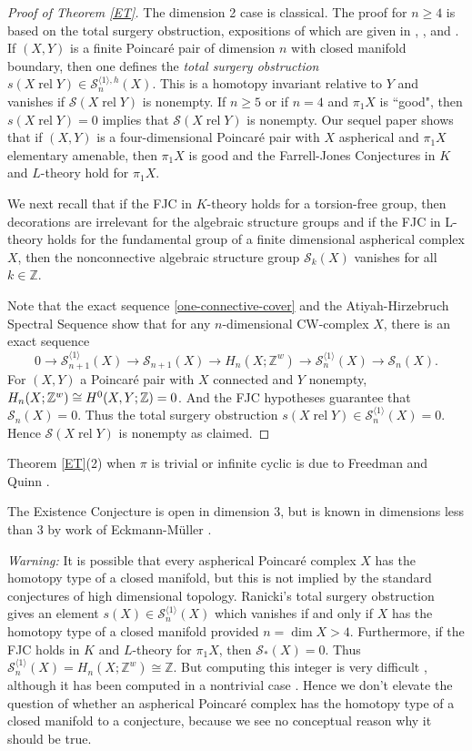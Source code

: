 \documentclass[12pt]{amsart}
\theoremstyle{definition}
\newcommand{\Z}{\mathbb Z}
\DeclareMathOperator{\rel}{rel}
\newcommand{\cS}{\mathcal S}
\begin{document}
\begin{proof}[Proof of Theorem \ref{ET}]
The dimension 2 case is classical.
 The proof for $n \geq 4$ is based on the total surgery obstruction, expositions of which are given in \cite{Ra}, \cite{R92}, and \cite{KMM}.    If $(X,Y)$ is a finite Poincar\'e pair of dimension $n$ with closed manifold boundary, then one defines the {\em total surgery obstruction} $s(X \rel Y) \in \cS^{\langle 1 \rangle,h}_n(X)$. This is a homotopy invariant relative to $Y$ and vanishes if $\cS(X \rel Y)$ is nonempty.   If $n \geq 5$ or if $n=4$ and $\pi_1X$ is ``good", then $s(X \rel Y) = 0$ implies that  $\cS(X \rel Y)$ is nonempty.  Our sequel paper \cite{DH2} shows that if $(X,Y)$ is a four-dimensional Poincar\'e pair with $X$ aspherical and $\pi_1X$ elementary amenable, then $\pi_1X$ is good and the Farrell-Jones Conjectures in $K$ and $L$-theory hold for $\pi_1X$.
 
 We next recall that if the FJC in $K$-theory holds for a torsion-free group, then decorations are irrelevant for the algebraic structure groups and if the FJC in L-theory holds for the fundamental group of a finite dimensional aspherical complex $X$, then the nonconnective algebraic structure group $\cS_k(X)$ vanishes for all $k \in \Z$.
 
 
 Note that the exact sequence \eqref{one-connective-cover} and the Atiyah-Hirzebruch Spectral Sequence show that for any $n$-dimensional CW-complex $X$, there is an exact sequence
$$
0 \to \cS^{\langle 1 \rangle}_{n+1}(X) \to \cS_{n+1}(X) \to H_n(X;\Z^w) \to \cS^{\langle 1 \rangle}_{n}(X) \to \cS_{n}(X).
$$
For $(X,Y)$ a Poincar\'e pair with $X$ connected and $Y$ nonempty, $H_n(X;\Z^w) \\ \cong H^0(X,Y;\Z) = 0$.  
And the FJC hypotheses guarantee that $\cS_n(X) = 0$.   Thus the total surgery obstruction $s(X \rel Y) \in\cS^{\langle 1 \rangle}_{n}(X)= 0$.   Hence $\cS(X \rel Y)$ is nonempty as claimed.
\end{proof}

Theorem \ref{ET}(2) when $\pi$ is trivial or infinite cyclic is due to Freedman and Quinn \cite[Proposition 11.6A]{FQ}.

The  Existence Conjecture is open in dimension 3, but is known in dimensions less than 3 by work of Eckmann-M\"uller \cite{EM80}.

{\em Warning:}   It is possible that every aspherical Poincar\'e complex $X$ has the homotopy type of a closed manifold, but this is not implied by the standard conjectures of high dimensional topology.  Ranicki's total surgery obstruction gives an element $s(X) \in \cS^{\langle 1 \rangle}_n(X)$ which vanishes if and only if $X$ has the homotopy type of a closed manifold provided $n = \dim X > 4$.   Furthermore, if the FJC holds in $K$ and $L$-theory for $\pi_1X$, then $\cS_*(X) = 0$.  Thus $\cS^{\langle 1 \rangle}_n(X) = H_n(X;\Z^w)  \cong \Z$.    But computing this integer is very difficult \cite{Q}, although it has been computed in a nontrivial case \cite{BLW}.    Hence we don't elevate the question of whether an aspherical Poincar\'e complex has the homotopy type of a closed manifold to a conjecture, because we see no conceptual reason why it should be true. 
\end{document}
